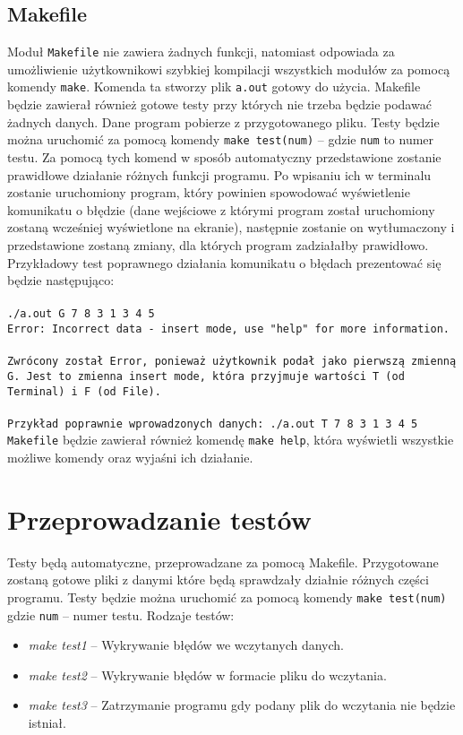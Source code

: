 \documentclass[12pt, a4paper]{article}
\begin{document}
\subsection{Makefile}
Moduł \texttt{Makefile} nie zawiera żadnych funkcji, natomiast odpowiada za umożliwienie użytkownikowi szybkiej kompilacji wszystkich modułów za pomocą komendy \texttt{make}. Komenda ta stworzy plik \texttt{a.out} gotowy do użycia. Makefile będzie zawierał również gotowe testy przy których nie trzeba będzie podawać żadnych danych. Dane program pobierze z przygotowanego pliku. Testy będzie można uruchomić za pomocą komendy \texttt{make test(num)} -- gdzie \texttt{num} to numer testu. Za pomocą tych komend w sposób automatyczny przedstawione zostanie prawidłowe działanie różnych funkcji programu. Po wpisaniu ich w terminalu zostanie uruchomiony program, który powinien spowodować wyświetlenie komunikatu o błędzie (dane wejściowe z którymi program został uruchomiony zostaną wcześniej wyświetlone na ekranie), następnie zostanie on wytłumaczony i przedstawione zostaną zmiany, dla których program zadziałałby prawidłowo. Przykładowy test poprawnego działania komunikatu o błędach prezentować się będzie następująco:\\\\
\texttt{./a.out G 7 8 3 1 3 4 5}\\
\texttt{Error: Incorrect data - insert mode, use "help" for more information.}\\\\
\texttt{Zwrócony został Error, ponieważ użytkownik podał jako pierwszą zmienną
G. Jest to zmienna insert mode, która przyjmuje wartości T (od Terminal)
i F (od File).}\\\\
\texttt{Przykład poprawnie wprowadzonych danych: ./a.out T 7 8 3 1 3 4 5}\\

\texttt{Makefile} będzie zawierał również komendę \texttt{make help}, która wyświetli wszystkie możliwe komendy oraz wyjaśni ich działanie.


\section{Przeprowadzanie testów}
Testy będą automatyczne, przeprowadzane za pomocą Makefile. Przygotowane zostaną gotowe pliki z danymi które będą sprawdzały działnie różnych części programu. Testy będzie można uruchomić za pomocą komendy \texttt{make test(num)} gdzie \texttt{num} -- numer testu. Rodzaje testów:
\begin{itemize}
    \item \textit{make test1} -- Wykrywanie błędów we wczytanych danych.
    \item \textit{make test2} -- Wykrywanie błędów w formacie pliku do wczytania.
    \item \textit{make test3} -- Zatrzymanie programu gdy podany plik do wczytania nie będzie istniał.
    
\end{itemize}
\end{document}
